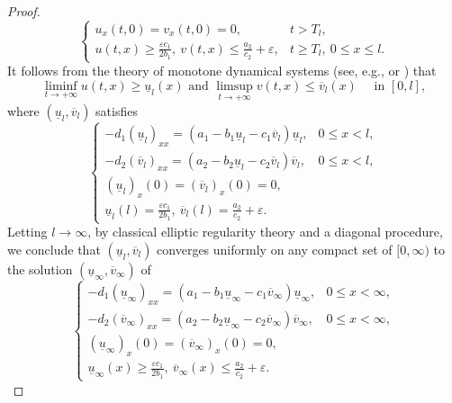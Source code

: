 \documentclass[reqno]{amsart}
\theoremstyle{plain}
\theoremstyle{definition}
\theoremstyle{remark}
\begin{document}
\begin{proof}
\begin{equation}
\begin{cases}
				u_x(t,0) = v_x(t, 0) = 0,
				& t > T_l,\\
				u(t,x) \geq \frac{\varepsilon c_1}{2b_1},
				~ v(t,x) \leq \frac{a_2}{c_2} + \varepsilon,
				& t \geq T_l,~ 0 \leq x \leq l.
			\end{cases}
		\end{equation}
		It follows from the theory of monotone dynamical systems (see, e.g., \cite[Chapter 4]{MR1319817} or
		\cite[Section 2]{MR1100011}) that
		\[
		\liminf_{t \to +\infty} u(t,x) \geq \underline{u}_l(x)
		\text{ and }
		\limsup_{t \to +\infty} v(t,x) \leq \overline{v}_l(x)
		\quad \text{ in } [0,l],
		\]
		where $(\underline{u}_l, \overline{v}_l)$ satisfies
		\begin{equation}\label{eq5prospread}
			\begin{cases}
				-d_1(\underline{u}_l)_{xx}
				= (a_1 - b_1\underline{u}_l - c_1\overline{v}_l)\underline{u}_l,
				& 0 \leq x < l,\\
				-d_2(\overline{v}_l)_{xx}
				= (a_2 - b_2\underline{u}_l - c_2\overline{v}_l)\overline{v}_l,
				& 0 \leq x < l,\\
				(\underline{u}_l)_x(0) = (\overline{v}_l)_x(0) = 0,\\
				\underline{u}_l(l) = \frac{\varepsilon c_1}{2b_1},
				~ \overline{v}_l(l) = \frac{a_2}{c_2} + \varepsilon.
			\end{cases}
		\end{equation}
		Letting $l \to \infty$, by classical elliptic regularity theory and a diagonal
		procedure, we conclude that $(\underline{u}_l,\overline{v}_l)$ converges
		uniformly on any compact set of $[0, \infty)$ to the solution
		$(\underline{u}_{\infty}, \overline{v}_{\infty})$ of
		\begin{equation}\label{eq6prospread}
			\begin{cases}
				-d_1(\underline{u}_{\infty})_{xx}
				= (a_1 - b_1\underline{u}_{\infty} - c_1\overline{v}_{\infty})
				\underline{u}_{\infty},
				& 0 \leq x < \infty,\\
				-d_2(\overline{v}_{\infty})_{xx}
				= (a_2 - b_2\underline{u}_{\infty} - c_2\overline{v}_{\infty}) \overline{v}_{\infty},
				& 0 \leq x < \infty,\\
				(\underline{u}_{\infty})_x(0) = (\overline{v}_{\infty})_x(0) = 0,\\
				\underline{u}_{\infty}(x) \geq \frac{\varepsilon c_1}{2b_1},
				~ \overline{v}_{\infty}(x) \leq \frac{a_2}{c_2} + \varepsilon.

\end{cases}
\end{equation}
\end{proof}
\end{document}
